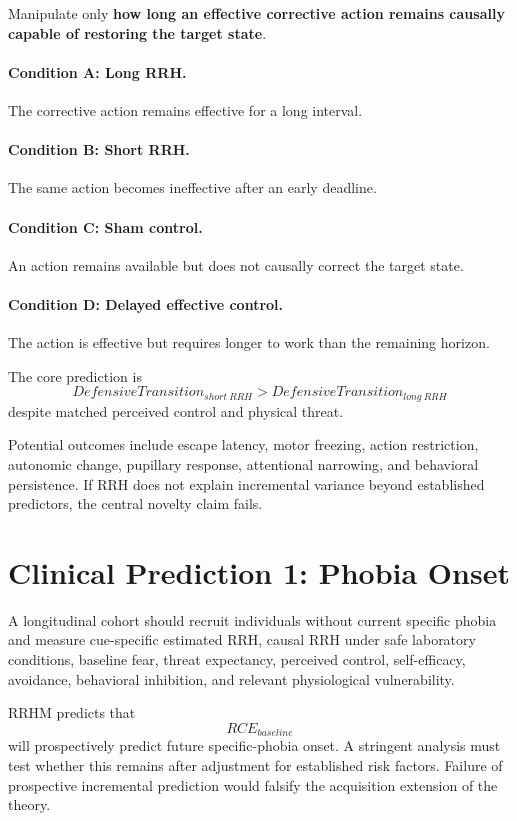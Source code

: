 \documentclass[11pt]{article}
\begin{document}
Manipulate only \textbf{how long an effective corrective action remains causally capable of restoring the target state}.

\paragraph{Condition A: Long RRH.} The corrective action remains effective for a long interval.

\paragraph{Condition B: Short RRH.} The same action becomes ineffective after an early deadline.

\paragraph{Condition C: Sham control.} An action remains available but does not causally correct the target state.

\paragraph{Condition D: Delayed effective control.} The action is effective but requires longer to work than the remaining horizon.

The core prediction is
\[
DefensiveTransition_{short\ RRH}>DefensiveTransition_{long\ RRH}
\]
despite matched perceived control and physical threat.

Potential outcomes include escape latency, motor freezing, action restriction, autonomic change, pupillary response, attentional narrowing, and behavioral persistence. If RRH does not explain incremental variance beyond established predictors, the central novelty claim fails.

\section{Clinical Prediction 1: Phobia Onset}

A longitudinal cohort should recruit individuals without current specific phobia and measure cue-specific estimated RRH, causal RRH under safe laboratory conditions, baseline fear, threat expectancy, perceived control, self-efficacy, avoidance, behavioral inhibition, and relevant physiological vulnerability.

RRHM predicts that
\[
RCE_{baseline}
\]
will prospectively predict future specific-phobia onset. A stringent analysis must test whether this remains after adjustment for established risk factors. Failure of prospective incremental prediction would falsify the acquisition extension of the theory.
\end{document}
